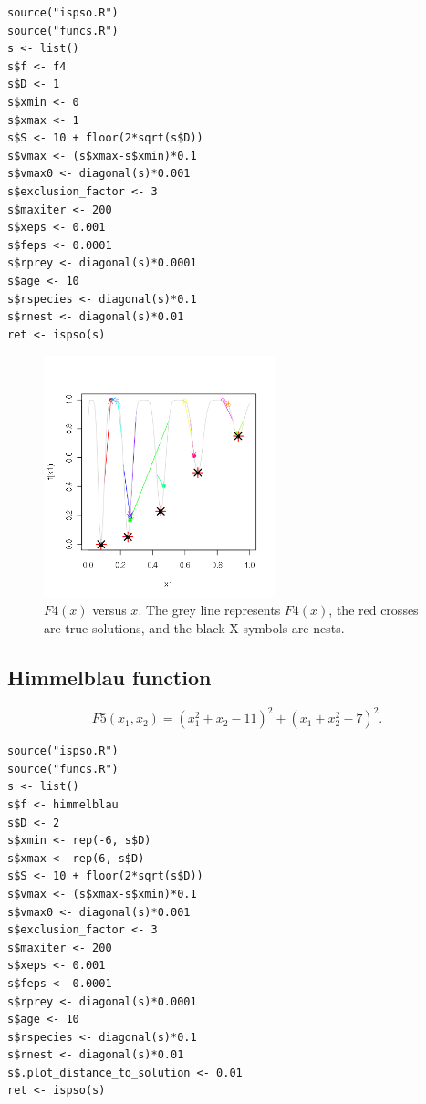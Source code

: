 \documentclass{article}
\begin{document}
\begin{verbatim}
source("ispso.R")
source("funcs.R")
s <- list()
s$f <- f4
s$D <- 1
s$xmin <- 0
s$xmax <- 1
s$S <- 10 + floor(2*sqrt(s$D))
s$vmax <- (s$xmax-s$xmin)*0.1
s$vmax0 <- diagonal(s)*0.001
s$exclusion_factor <- 3
s$maxiter <- 200
s$xeps <- 0.001
s$feps <- 0.0001
s$rprey <- diagonal(s)*0.0001
s$age <- 10
s$rspecies <- diagonal(s)*0.1
s$rnest <- diagonal(s)*0.01
ret <- ispso(s)
\end{verbatim}

\begin{figure}[htbp]
  \centering
  \includegraphics[width=0.6\textwidth]{f4.png}
  \caption{$F4(x)$ versus $x$. The grey line represents $F4(x)$, the red crosses are true solutions, and the black X symbols are nests.}
\end{figure}

\subsection{Himmelblau function}

\begin{equation*}
  F5(x_1, x_2)=(x_1^2+x_2-11)^2+(x_1+x_2^2-7)^2.
\end{equation*}

\begin{verbatim}
source("ispso.R")
source("funcs.R")
s <- list()
s$f <- himmelblau
s$D <- 2
s$xmin <- rep(-6, s$D)
s$xmax <- rep(6, s$D)
s$S <- 10 + floor(2*sqrt(s$D))
s$vmax <- (s$xmax-s$xmin)*0.1
s$vmax0 <- diagonal(s)*0.001
s$exclusion_factor <- 3
s$maxiter <- 200
s$xeps <- 0.001
s$feps <- 0.0001
s$rprey <- diagonal(s)*0.0001
s$age <- 10
s$rspecies <- diagonal(s)*0.1
s$rnest <- diagonal(s)*0.01
s$.plot_distance_to_solution <- 0.01
ret <- ispso(s)
\end{verbatim}
\end{document}
